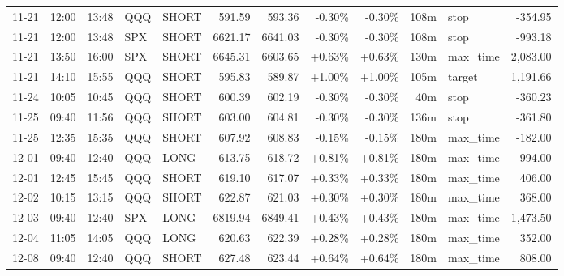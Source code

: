 \documentclass[11pt,a4paper]{article}
\begin{document}
\begin{center}
\begin{longtable}{>{\color{txtmain}}l l l l l r r r r r >{\color{txtmain}}l r}
11-21 & 12:00 & 13:48 & QQQ & SHORT & 591.59 & 593.36 & \textcolor{lossred}{-0.30\%} & \textcolor{lossred}{-0.30\%} & 108m & stop & \textcolor{lossred}{-354.95} \\
11-21 & 12:00 & 13:48 & SPX & SHORT & 6621.17 & 6641.03 & \textcolor{lossred}{-0.30\%} & \textcolor{lossred}{-0.30\%} & 108m & stop & \textcolor{lossred}{-993.18} \\
11-21 & 13:50 & 16:00 & SPX & SHORT & 6645.31 & 6603.65 & \textcolor{wingreen}{+0.63\%} & \textcolor{wingreen}{+0.63\%} & 130m & max\_time & \textcolor{wingreen}{2,083.00} \\
11-21 & 14:10 & 15:55 & QQQ & SHORT & 595.83 & 589.87 & \textcolor{wingreen}{+1.00\%} & \textcolor{wingreen}{+1.00\%} & 105m & target & \textcolor{wingreen}{1,191.66} \\
11-24 & 10:05 & 10:45 & QQQ & SHORT & 600.39 & 602.19 & \textcolor{lossred}{-0.30\%} & \textcolor{lossred}{-0.30\%} & 40m & stop & \textcolor{lossred}{-360.23} \\
11-25 & 09:40 & 11:56 & QQQ & SHORT & 603.00 & 604.81 & \textcolor{lossred}{-0.30\%} & \textcolor{lossred}{-0.30\%} & 136m & stop & \textcolor{lossred}{-361.80} \\
11-25 & 12:35 & 15:35 & QQQ & SHORT & 607.92 & 608.83 & \textcolor{lossred}{-0.15\%} & \textcolor{lossred}{-0.15\%} & 180m & max\_time & \textcolor{lossred}{-182.00} \\
12-01 & 09:40 & 12:40 & QQQ & LONG & 613.75 & 618.72 & \textcolor{wingreen}{+0.81\%} & \textcolor{wingreen}{+0.81\%} & 180m & max\_time & \textcolor{wingreen}{994.00} \\
12-01 & 12:45 & 15:45 & QQQ & SHORT & 619.10 & 617.07 & \textcolor{wingreen}{+0.33\%} & \textcolor{wingreen}{+0.33\%} & 180m & max\_time & \textcolor{wingreen}{406.00} \\
12-02 & 10:15 & 13:15 & QQQ & SHORT & 622.87 & 621.03 & \textcolor{wingreen}{+0.30\%} & \textcolor{wingreen}{+0.30\%} & 180m & max\_time & \textcolor{wingreen}{368.00} \\
12-03 & 09:40 & 12:40 & SPX & LONG & 6819.94 & 6849.41 & \textcolor{wingreen}{+0.43\%} & \textcolor{wingreen}{+0.43\%} & 180m & max\_time & \textcolor{wingreen}{1,473.50} \\
12-04 & 11:05 & 14:05 & QQQ & LONG & 620.63 & 622.39 & \textcolor{wingreen}{+0.28\%} & \textcolor{wingreen}{+0.28\%} & 180m & max\_time & \textcolor{wingreen}{352.00} \\
12-08 & 09:40 & 12:40 & QQQ & SHORT & 627.48 & 623.44 & \textcolor{wingreen}{+0.64\%} & \textcolor{wingreen}{+0.64\%} & 180m & max\_time & \textcolor{wingreen}{808.00} \\

\end{longtable}
\end{center}
\end{document}
